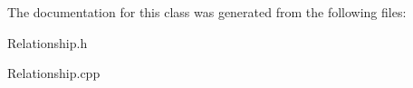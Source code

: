 The documentation for this class was generated from the following files\+:\begin{DoxyCompactItemize}
\item 
Relationship.\+h\item 
Relationship.\+cpp\end{DoxyCompactItemize}
